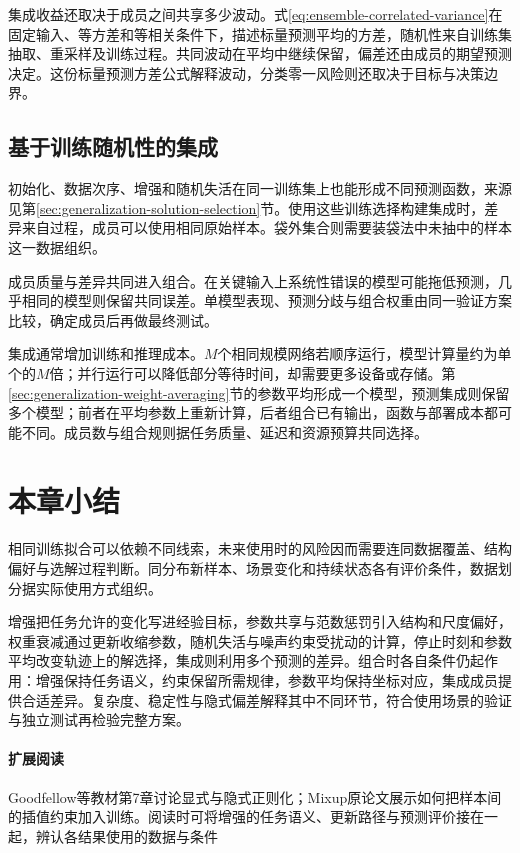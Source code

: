 集成收益还取决于成员之间共享多少波动。式\eqref{eq:ensemble-correlated-variance}在固定输入、等方差和等相关条件下，描述标量预测平均的方差，随机性来自训练集抽取、重采样及训练过程。共同波动在平均中继续保留，偏差还由成员的期望预测决定。这份标量预测方差公式解释波动，分类零一风险则还取决于目标与决策边界。

\subsection{基于训练随机性的集成}
\label{sec:generalization-randomness-ensemble}

初始化、数据次序、增强和随机失活在同一训练集上也能形成不同预测函数，来源见第\ref{sec:generalization-solution-selection}节。使用这些训练选择构建集成时，差异来自过程，成员可以使用相同原始样本。袋外集合则需要装袋法中未抽中的样本这一数据组织。

成员质量与差异共同进入组合。在关键输入上系统性错误的模型可能拖低预测，几乎相同的模型则保留共同误差。单模型表现、预测分歧与组合权重由同一验证方案比较，确定成员后再做最终测试。

集成通常增加训练和推理成本。$M$个相同规模网络若顺序运行，模型计算量约为单个的$M$倍；并行运行可以降低部分等待时间，却需要更多设备或存储。第\ref{sec:generalization-weight-averaging}节的参数平均形成一个模型，预测集成则保留多个模型；前者在平均参数上重新计算，后者组合已有输出，函数与部署成本都可能不同。成员数与组合规则据任务质量、延迟和资源预算共同选择。

\section{本章小结}
\label{sec:generalization-summary}

相同训练拟合可以依赖不同线索，未来使用时的风险因而需要连同数据覆盖、结构偏好与选解过程判断。同分布新样本、场景变化和持续状态各有评价条件，数据划分据实际使用方式组织。

增强把任务允许的变化写进经验目标，参数共享与范数惩罚引入结构和尺度偏好，权重衰减通过更新收缩参数，随机失活与噪声约束受扰动的计算，停止时刻和参数平均改变轨迹上的解选择，集成则利用多个预测的差异。组合时各自条件仍起作用：增强保持任务语义，约束保留所需规律，参数平均保持坐标对应，集成成员提供合适差异。复杂度、稳定性与隐式偏差解释其中不同环节，符合使用场景的验证与独立测试再检验完整方案。

\paragraph{扩展阅读}
Goodfellow等教材第7章讨论显式与隐式正则化；Mixup原论文展示如何把样本间的插值约束加入训练。阅读时可将增强的任务语义、更新路径与预测评价接在一起，辨认各结果使用的数据与条件
